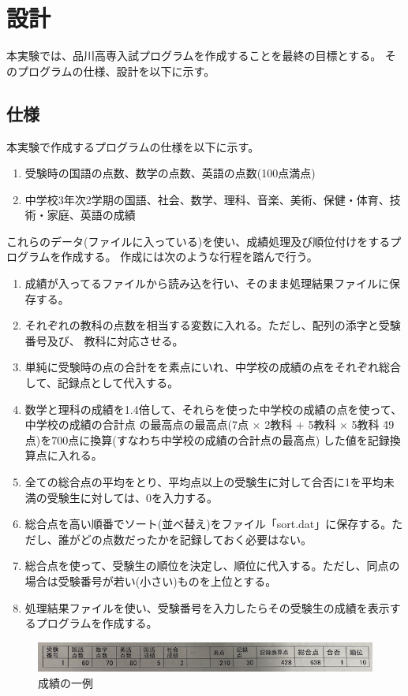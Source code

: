 \documentclass{jsarticle}
\begin{document}
\newpage
\section{設計}
本実験では、品川高専入試プログラムを作成することを最終の目標とする。
そのプログラムの仕様、設計を以下に示す。
\subsection{仕様}\label{s3_2}
本実験で作成するプログラムの仕様を以下に示す。
\begin{enumerate}
  \item 受験時の国語の点数、数学の点数、英語の点数(100点満点)
  \item 中学校3年次2学期の国語、社会、数学、理科、音楽、美術、保健・体育、技術・家庭、英語の成績
\end{enumerate}

これらのデータ(ファイルに入っている)を使い、成績処理及び順位付けをするプログラムを作成する。
作成には次のような行程を踏んで行う。

\begin{enumerate}
  \item 成績が入ってるファイルから読み込を行い、そのまま処理結果ファイルに保存する。
  \item それぞれの教科の点数を相当する変数に入れる。ただし、配列の添字と受験番号及び、
  教科に対応させる。
  \item 単純に受験時の点の合計をを素点にいれ、中学校の成績の点をそれぞれ総合して、記録点として代入する。
  \item 数学と理科の成績を1.4倍して、それらを使った中学校の成績の点を使って、中学校の成績の合計点
  の最高点の最高点(7点 $\times$ 2教科 $+$ 5教科 $\times$ 5教科 \= 49点)を700点に換算(すなわち中学校の成績の合計点の最高点)
  した値を記録換算点に入れる。
  \item 全ての総合点の平均をとり、平均点以上の受験生に対して合否に1を平均未満の受験生に対しては、0を入力する。
  \item 総合点を高い順番でソート(並べ替え)をファイル「sort.dat」に保存する。ただし、誰がどの点数だったかを記録しておく必要はない。
  \item 総合点を使って、受験生の順位を決定し、順位に代入する。ただし、同点の場合は受験番号が若い(小さい)ものを上位とする。
  \item 処理結果ファイルを使い、受験番号を入力したらその受験生の成績を表示するプログラムを作成する。
\end{enumerate}

\begin{figure}[H]
  \begin{center}
    \includegraphics[width = 14cm,angle=90,height=1cm]{f1.png}
    \caption{成績の一例\label{f1}}
  \end{center}
\end{figure}
\end{document}
